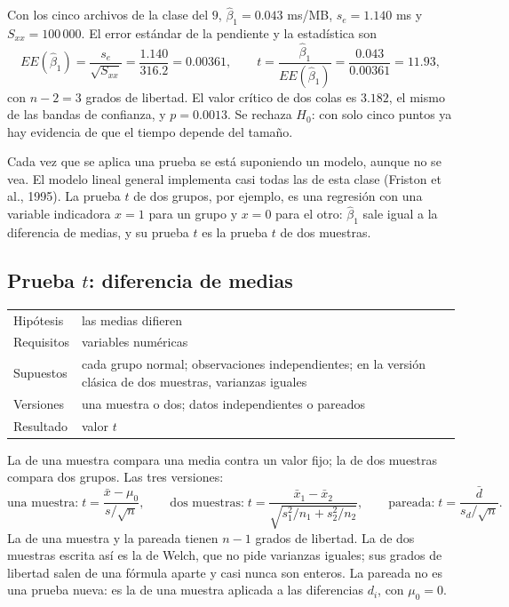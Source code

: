 \documentclass[11pt,letterpaper]{article}
\begin{document}
\begin{ejemplo}
    Con los cinco archivos de la clase del $9$, $\hat{\beta}_1 = 0.043$
    ms/MB, $s_e = 1.140$ ms y $S_{xx} = 100\,000$. El error estándar de
    la pendiente y la estadística son
    \[
        EE(\hat{\beta}_1) = \frac{s_e}{\sqrt{S_{xx}}}
        = \frac{1.140}{316.2} = 0.00361 ,
        \qquad
        t = \frac{\hat{\beta}_1}{EE(\hat{\beta}_1)}
          = \frac{0.043}{0.00361} = 11.93 ,
    \]
    con $n - 2 = 3$ grados de libertad. El valor crítico de dos colas
    es $3.182$, el mismo de las bandas de confianza, y $p = 0.0013$. Se
    rechaza $H_0$: con solo cinco puntos ya hay evidencia de que el
    tiempo depende del tamaño.
\end{ejemplo}

Cada vez que se aplica una prueba se está suponiendo un modelo, aunque
no se vea. El modelo lineal general implementa casi todas las de esta
clase (Friston et al., 1995). La prueba $t$ de dos grupos, por ejemplo,
es una regresión con una variable indicadora $x = 1$ para un grupo y
$x = 0$ para el otro: $\hat{\beta}_1$ sale igual a la diferencia de
medias, y su prueba $t$ es la prueba $t$ de dos muestras.


\subsection*{Prueba $t$: diferencia de medias}

\begin{center}
\small
\begin{tabular}{l>{\raggedright\arraybackslash}p{10.5cm}}
    \toprule
    Hipótesis & las medias difieren \\
    Requisitos & variables numéricas \\
    Supuestos & cada grupo normal; observaciones independientes; en la
                versión clásica de dos muestras, varianzas iguales \\
    Versiones & una muestra o dos; datos independientes o pareados \\
    Resultado & valor $t$ \\
    \bottomrule
\end{tabular}
\end{center}

La de una muestra compara una media contra un valor fijo; la de dos
muestras compara dos grupos. Las tres versiones:
\[
    \text{una muestra:}\;
    t = \frac{\bar{x} - \mu_0}{s / \sqrt{n}} ,
    \qquad
    \text{dos muestras:}\;
    t = \frac{\bar{x}_1 - \bar{x}_2}
             {\sqrt{s_1^2 / n_1 + s_2^2 / n_2}} ,
    \qquad
    \text{pareada:}\;
    t = \frac{\bar{d}}{s_d / \sqrt{n}} .
\]
La de una muestra y la pareada tienen $n - 1$ grados de libertad. La de
dos muestras escrita así es la de Welch, que no pide varianzas iguales;
sus grados de libertad salen de una fórmula aparte y casi nunca son
enteros. La pareada no es una prueba nueva: es la de una muestra
aplicada a las diferencias $d_i$, con $\mu_0 = 0$.
\end{document}
